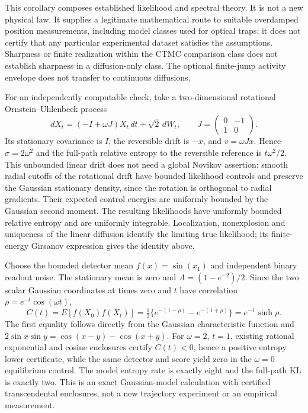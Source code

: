 This corollary composes established likelihood and spectral theory. It is not
a new physical law. It supplies a legitimate mathematical route to suitable
overdamped position measurements, including model classes used for optical
traps; it does not certify that any particular experimental dataset satisfies
the assumptions. Sharpness or finite realization within the CTMC comparison
class does not establish sharpness in a diffusion-only class. The optional
finite-jump activity envelope does not transfer to continuous diffusions.

For an independently computable check, take a two-dimensional rotational
Ornstein--Uhlenbeck process
\[
 dX_t=(-I+\omega J)X_t\,dt+\sqrt2\,dW_t,
 \qquad J=\begin{pmatrix}0&-1\\1&0\end{pmatrix}.
\]
Its stationary covariance is $I$, the reversible drift is $-x$, and
$v=\omega Jx$. Hence $\sigma=2\omega^2$ and the full-path relative entropy
to the reversible reference is $t\omega^2/2$. This unbounded linear drift
does not need a global Novikov assertion: smooth radial cutoffs of the
rotational drift have bounded likelihood controls and preserve the Gaussian
stationary density, since the rotation is orthogonal to radial gradients.
Their expected control energies are uniformly bounded by the Gaussian second
moment. The resulting likelihoods have uniformly bounded relative entropy
and are uniformly integrable. Localization, nonexplosion and uniqueness of
the linear diffusion identify the limiting true likelihood; its finite-energy
Girsanov expression gives the identity above.

Choose the bounded detector mean $f(x)=\sin(x_1)$ and independent binary
readout noise. The stationary mean is zero and
$A=(1-e^{-2})/2$. Since the two scalar Gaussian coordinates at times zero and
$t$ have correlation $\rho=e^{-t}\cos(\omega t)$,
\[
 C(t)=E[f(X_0)f(X_t)]
 =\tfrac12\{e^{-(1-\rho)}-e^{-(1+\rho)}\}
 =e^{-1}\sinh\rho.
\]
The first equality follows directly from the Gaussian characteristic function
and $2\sin x\sin y=\cos(x-y)-\cos(x+y)$.
For $\omega=2$, $t=1$, existing rational exponential and cosine enclosures
certify $C(t)<0$, hence a positive entropy lower certificate, while the same
detector and score yield zero in the $\omega=0$ equilibrium control.
The model entropy rate is exactly eight and the full-path KL is exactly two.
This is an exact Gaussian-model calculation with certified transcendental
enclosures, not a new trajectory experiment or an empirical measurement.

